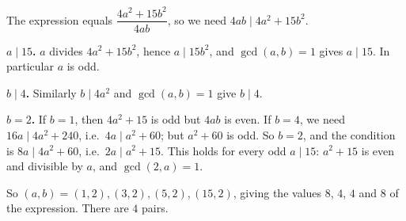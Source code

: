 The expression equals $\dfrac{4a^2+15b^2}{4ab}$, so we need $4ab\mid4a^2+15b^2$.

\textbf{$a\mid15$.} $a$ divides $4a^2+15b^2$, hence $a\mid15b^2$, and $\gcd(a,b)=1$ gives $a\mid15$. In particular $a$ is odd.

\textbf{$b\mid4$.} Similarly $b\mid4a^2$ and $\gcd(a,b)=1$ give $b\mid4$.

\textbf{$b=2$.} If $b=1$, then $4a^2+15$ is odd but $4ab$ is even. If $b=4$, we need $16a\mid4a^2+240$, i.e.\ $4a\mid a^2+60$; but $a^2+60$ is odd. So $b=2$, and the condition is $8a\mid4a^2+60$, i.e.\ $2a\mid a^2+15$. This holds for every odd $a\mid15$: $a^2+15$ is even and divisible by $a$, and $\gcd(2,a)=1$.

So $(a,b)=(1,2),(3,2),(5,2),(15,2)$, giving the values $8$, $4$, $4$ and $8$ of the expression. There are $\boxed{4}$ pairs.
